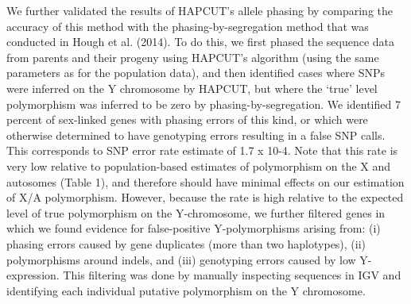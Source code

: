 \documentclass[9pt,twocolumn,twoside]{gsajnl}
\begin{document}
We further validated the results of HAPCUT’s allele phasing by comparing the accuracy of this method with the phasing-by-segregation method that was conducted in Hough et al. (2014). To do this, we first phased the sequence data from parents and their progeny using HAPCUT’s algorithm (using the same parameters as for the population data), and then identified cases where SNPs were inferred on the Y chromosome by HAPCUT, but where the ‘true’ level polymorphism was inferred to be zero by phasing-by-segregation. We identified 7 percent of sex-linked genes with phasing errors of this kind, or which were otherwise determined to have genotyping errors resulting in a false SNP calls. This corresponds to SNP error rate estimate of 1.7 x 10-4. Note that this rate is very low relative to population-based estimates of polymorphism on the X and autosomes (Table 1), and therefore should have minimal effects on our estimation of X/A polymorphism. However, because the rate is high relative to the expected level of true polymorphism on the Y-chromosome, we further filtered genes in which we found evidence for false-positive Y-polymorphisms arising from: (i) phasing errors caused by gene duplicates (more than two haplotypes), (ii) polymorphisms around indels, and (iii) genotyping errors caused by low Y-expression. This filtering was done by manually inspecting sequences in IGV \citep{robinson2011integrative} and identifying each individual putative polymorphism on the Y chromosome.
\end{document}
